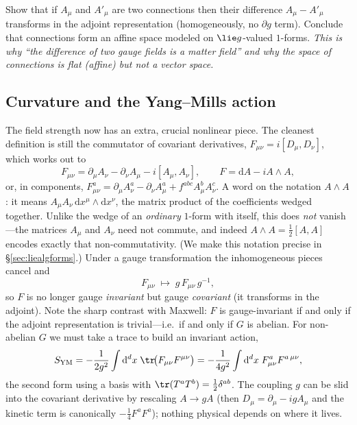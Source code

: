 \documentclass[11pt]{article}
\newcommand{\dd}{\mathrm{d}}                 %
\begin{document}
\begin{xca}
Show that if $A_\mu$ and $A'_\mu$ are two connections then their difference
$A_\mu - A'_\mu$ transforms in the adjoint representation (homogeneously, no
$\partial g$ term). Conclude that connections form an affine space modeled on
$\lie g$-valued $1$-forms. \emph{This is why ``the difference of two gauge fields is a
matter field'' and why the space of connections is flat (affine) but not a vector
space.}
\end{xca}

\subsection{Curvature and the Yang--Mills action}

The field strength now has an extra, crucial nonlinear piece. The cleanest definition is
still the commutator of covariant derivatives, $F_{\mu\nu}=i[D_\mu,D_\nu]$, which works
out to
\[
F_{\mu\nu} = \partial_\mu A_\nu - \partial_\nu A_\mu - i[A_\mu,A_\nu],
\qquad
F = \dd A - iA\wedge A,
\]
or, in components, $F_{\mu\nu}^a=\partial_\mu A_\nu^a-\partial_\nu A_\mu^a+f^{abc}A_\mu^b
A_\nu^c$. A word on the notation $A\wedge A$: it means $A_\mu A_\nu\,\dd x^\mu\wedge\dd
x^\nu$, the matrix product of the coefficients wedged together. Unlike the wedge of an
\emph{ordinary} $1$-form with itself, this does \emph{not} vanish---the matrices $A_\mu$
and $A_\nu$ need not commute, and indeed $A\wedge A=\tfrac12[A,A]$ encodes exactly that
non-commutativity. (We make this notation precise in \S\ref{sec:liealgforms}.) Under a
gauge transformation the inhomogeneous pieces cancel and
\[
F_{\mu\nu}\;\longmapsto\;g\,F_{\mu\nu}\,g^{-1},
\]
so $F$ is no longer gauge \emph{invariant} but gauge \emph{covariant} (it transforms in
the adjoint). Note the sharp contrast with Maxwell: $F$ is gauge-invariant if and only if
the adjoint representation is trivial---i.e.\ if and only if $G$ is abelian. For
non-abelian $G$ we must take a trace to build an invariant action,
\[
S_{\mathrm{YM}} = -\frac{1}{2g^2}\int \dd^dx\;\tr\!\big(F_{\mu\nu}F^{\mu\nu}\big)
= -\frac{1}{4g^2}\int \dd^dx\;F_{\mu\nu}^a F^{a\,\mu\nu},
\]
the second form using a basis with $\tr(T^aT^b)=\tfrac12\delta^{ab}$. The coupling $g$ can
be slid into the covariant derivative by rescaling $A\to gA$ (then $D_\mu=\partial_\mu-ig
A_\mu$ and the kinetic term is canonically $-\tfrac14 F^aF^a$); nothing physical depends
on where it lives.
\end{document}
